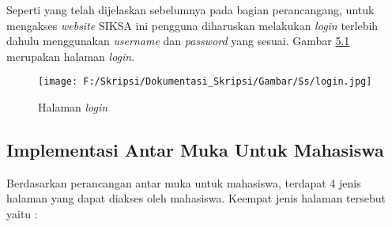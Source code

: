 Seperti yang telah dijelaskan sebelumnya pada bagian perancangang, untuk mengakses \textit{website} SIKSA ini pengguna diharuskan melakukan \textit{login} terlebih dahulu menggunakan \textit{username} dan \textit{password} yang sesuai. Gambar \hyperlink{login}{5.1} merupakan halaman \textit{login}.
\begin{figure}[H]
	\centering
		\texttt{[image: F:/Skripsi/Dokumentasi\_Skripsi/Gambar/Ss/login.jpg]}
		\caption{Halaman \textit{login}}
		\label{fig:login}
	\end{figure}

\subsection{Implementasi Antar Muka Untuk Mahasiswa}
\label{sec:implementasi_antar_muka_mahasiswa}
Berdasarkan perancangan antar muka untuk mahasiswa, terdapat 4 jenis halaman yang dapat diakses oleh mahasiswa. Keempat jenis halaman tersebut yaitu :
